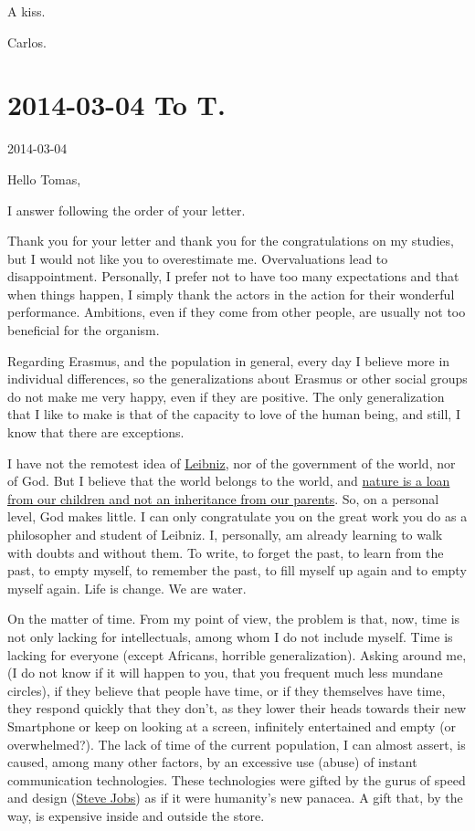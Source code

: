 \documentclass[]{book}
\begin{document}
A kiss.

Carlos.

\hypertarget{toT20140304}{%
\section*{2014-03-04 To T.}\label{toT20140304}}

2014-03-04

Hello Tomas,

I answer following the order of your letter.

Thank you for your letter and thank you for the congratulations on my studies, but I would not like you to overestimate me. Overvaluations lead to disappointment. Personally, I prefer not to have too many expectations and that when things happen, I simply thank the actors in the action for their wonderful performance. Ambitions, even if they come from other people, are usually not too beneficial for the organism.

Regarding Erasmus, and the population in general, every day I believe more in individual differences, so the generalizations about Erasmus or other social groups do not make me very happy, even if they are positive. The only generalization that I like to make is that of the capacity to love of the human being, and still, I know that there are exceptions.

I have not the remotest idea of \href{https://en.wikipedia.org/wiki/Gottfried_Wilhelm_Leibniz}{Leibniz}, nor of the government of the world, nor of God. But I believe that the world belongs to the world, and \href{https://quoteinvestigator.com/2013/01/22/borrow-earth/}{nature is a loan from our children and not an inheritance from our parents}. So, on a personal level, God makes little. I can only congratulate you on the great work you do as a philosopher and student of Leibniz. I, personally, am already learning to walk with doubts and without them. To write, to forget the past, to learn from the past, to empty myself, to remember the past, to fill myself up again and to empty myself again. Life is change. We are water.

On the matter of time. From my point of view, the problem is that, now, time is not only lacking for intellectuals, among whom I do not include myself. Time is lacking for everyone (except Africans, horrible generalization). Asking around me, (I do not know if it will happen to you, that you frequent much less mundane circles), if they believe that people have time, or if they themselves have time, they respond quickly that they don't, as they lower their heads towards their new Smartphone or keep on looking at a screen, infinitely entertained and empty (or overwhelmed?). The lack of time of the current population, I can almost assert, is caused, among many other factors, by an excessive use (abuse) of instant communication technologies. These technologies were gifted by the gurus of speed and design (\href{https://en.wikipedia.org/wiki/Steve_Jobs}{Steve Jobs}) as if it were humanity's new panacea. A gift that, by the way, is expensive inside and outside the store.
\end{document}
